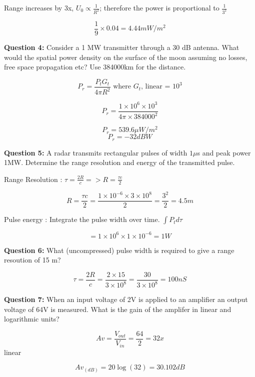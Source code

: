 \documentclass[a4paper,12pt]{article} %
\begin{document}
\vspace*{1ex}
Range increases by 3x, $U_0 \propto \frac{1}{R^2}$; therefore the power is proportional to $\frac{1}{3^2}$
\vspace*{1ex}

$$\frac{1}{9}\times 0.04 = 4.44 mW/m^2 $$

\vspace{1ex}
\textbf{Question 4:} Consider a 1 MW transmitter through a 30 dB antenna. What would the spatial power density on the surface of the moon assuming no losses, free space propagation etc? Use 384000km for the distance.

\vspace*{1ex}
$$P_r = \frac{P_t G_t}{4\pi R^2} \text{    where $G_t$, linear = $10^3$}$$ 

$$P_r = \frac{1\times10^6 \times10^3}{4\pi \times384000^2}$$

\vspace*{1ex}
$$P_r = 539.6 \mu W/m^2$$
$$P_r = -32 dBW $$


\vspace{1ex}
\textbf{Question 5:} A radar transmits rectangular pulses of width $1 \mu$s and peak power 1MW. Determine the range resolution and energy of the transmitted pulse.

\vspace*{1ex}
Range Resolution : $\tau = \frac{2R}{c} => R = \frac{\tau c}{2}$

$$ R = \frac{\tau c}{2} = \frac{1\times10^{-6} \times 3\times10^8}{2} = \frac{3^2}{2} = 4.5m $$

\vspace*{1ex}
Pulse energy : Integrate the pulse width over time. $\int P_t d\tau$

$$ = 1\times10^6\times1\times10^{-6} = 1W$$


\vspace{1ex}
\textbf{Question 6:} What (uncompressed) pulse width is required to give a range resoution of 15 m?

\vspace*{1ex}
$$\tau = \frac{2R}{c} = \frac{2\times 15}{3\times10^8} = \frac{30}{3\times10^8} = 100 nS$$


\vspace{2ex}
\textbf{Question 7:}
 When an input voltage of 2V is applied to an amplifier an output voltage of 64V is measured. What is the gain of the amplifer in linear and logarithmic units?

 \vspace*{1ex}

 $$Av = \frac{V_{out}}{V_{in}} = \frac{64}{2} = 32x $$ linear

 $$Av_{(dB)} = 20 \log (32) = 30.102 dB$$
\end{document}
